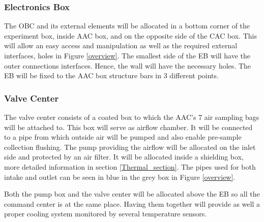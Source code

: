 \subsubsection{Electronics Box}

The OBC and its external elements will be allocated in a bottom corner of the experiment box, inside AAC box, and on the opposite side of the CAC box. This will allow an easy access and manipulation as well as the required external interfaces, holes in Figure \ref{overview}. The smallest side of the EB will have the outer connections interfaces. Hence, the wall will have the necessary holes. The EB will be fixed to the AAC box structure bars in 3 different points.




\pagebreak
\subsubsection{Valve Center}

The valve center consists of a coated box to which the AAC's 7 air sampling bags will be attached to. This box will serve as airflow chamber. It will be connected to a pipe from which outside air will be pumped and also enable pre-sample collection flushing. The pump providing the airflow will be allocated on the inlet side and protected by an air filter. It will be allocated inside a shielding box, more detailed information in section \ref{Thermal_section}. The pipes used for both intake and outlet can be seen in blue in the grey box in Figure \ref{overview}.

\smallskip
Both the pump box and the valve center will be allocated above the EB so all the command center is at the same place. Having them together will provide as well a proper cooling system monitored by several temperature sensors. %



